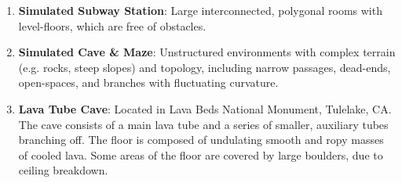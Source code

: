 \documentclass[letterpaper]{article} %
\newcommand{\ph}[1]{{\textbf{#1}:}} %
\begin{document}

\vspace{0pt}
\begin{enumerate}[label={\arabic*)}]
  \itemsep0em 
  \setlength{\itemsep}{0pt}
  \setlength{\parskip}{0pt}
  \item \textbf{Simulated Subway Station}: Large interconnected, polygonal rooms with level-floors, which are free of obstacles.
  \item \textbf{Simulated Cave \& Maze}: Unstructured environments with complex terrain (e.g. rocks, steep slopes) and topology, including narrow passages, dead-ends, open-spaces, and branches with fluctuating curvature. 
  \item \textbf{Lava Tube Cave}: Located in Lava Beds National Monument, Tulelake, CA. The cave consists of a main lava tube and a series of smaller, auxiliary tubes branching off. The floor is composed of undulating smooth and ropy masses of cooled lava. Some areas of the floor are covered by large boulders, due to ceiling breakdown. 
\end{enumerate}
\vspace{-4pt}
\end{document}
